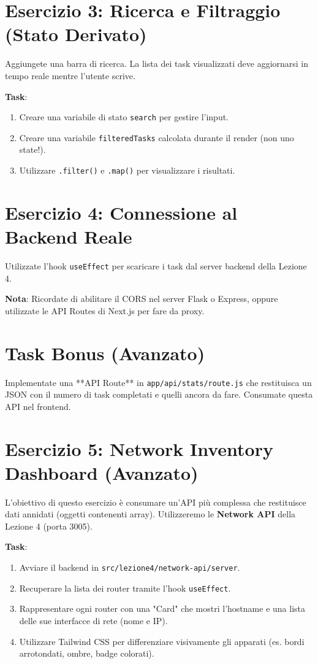 \documentclass[11pt,a4paper]{article}
\begin{document}
\section{Esercizio 3: Ricerca e Filtraggio (Stato Derivato)}
Aggiungete una barra di ricerca. La lista dei task visualizzati deve aggiornarsi in tempo reale mentre l'utente scrive.

\textbf{Task}:
\begin{enumerate}
    \item Creare una variabile di stato \texttt{search} per gestire l'input.
    \item Creare una variabile \texttt{filteredTasks} calcolata durante il render (non uno state!).
    \item Utilizzare \texttt{.filter()} e \texttt{.map()} per visualizzare i risultati.
\end{enumerate}

\section{Esercizio 4: Connessione al Backend Reale}
Utilizzate l'hook \texttt{useEffect} per scaricare i task dal server backend della Lezione 4.

\textbf{Nota}: Ricordate di abilitare il CORS nel server Flask o Express, oppure utilizzate le API Routes di Next.js per fare da proxy.

\section{Task Bonus (Avanzato)}
Implementate una **API Route** in \texttt{app/api/stats/route.js} che restituisca un JSON con il numero di task completati e quelli ancora da fare. Consumate questa API nel frontend.

\section{Esercizio 5: Network Inventory Dashboard (Avanzato)}
L'obiettivo di questo esercizio è consumare un'API più complessa che restituisce dati annidati (oggetti contenenti array). Utilizzeremo le \textbf{Network API} della Lezione 4 (porta 3005).

\textbf{Task}:
\begin{enumerate}
    \item Avviare il backend in \texttt{src/lezione4/network-api/server}.
    \item Recuperare la lista dei router tramite l'hook \texttt{useEffect}.
    \item Rappresentare ogni router con una "Card" che mostri l'hostname e una lista delle sue interfacce di rete (nome e IP).
    \item Utilizzare Tailwind CSS per differenziare visivamente gli apparati (es. bordi arrotondati, ombre, badge colorati).
\end{enumerate}
\end{document}
